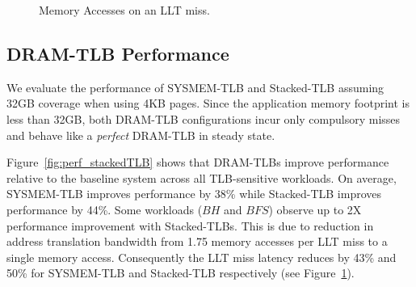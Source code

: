 \begin{figure}[tp] 
  \vspace{0.in} \centering
  \centerline{}

  \caption{\small Memory Accesses on an LLT miss.\normalsize}
  \label{fig:tlblat_stackedTLB} 
  \vspace{-0.1 in}
\end{figure}

\subsection{DRAM-TLB Performance}



\noindent We evaluate the performance of SYSMEM-TLB and Stacked-TLB
assuming 32GB coverage when using 4KB pages. Since the application
memory footprint is less than 32GB, both DRAM-TLB configurations incur
only compulsory misses and behave like a {\em perfect} DRAM-TLB in
steady state.


Figure~\ref{fig:perf_stackedTLB} shows that DRAM-TLBs improve
performance relative to the baseline system across all TLB-sensitive
workloads. On average, SYSMEM-TLB improves performance by 38\% while
Stacked-TLB improves performance by 44\%. Some workloads ($BH$ and
$BFS$) observe up to 2X performance improvement with Stacked-TLBs.
This is due to reduction in address translation bandwidth from 1.75
memory accesses per LLT miss to a single memory access. Consequently
the LLT miss latency reduces by 43\% and 50\% for SYSMEM-TLB and
Stacked-TLB respectively (see Figure~\ref{fig:tlblat_stackedTLB}).

